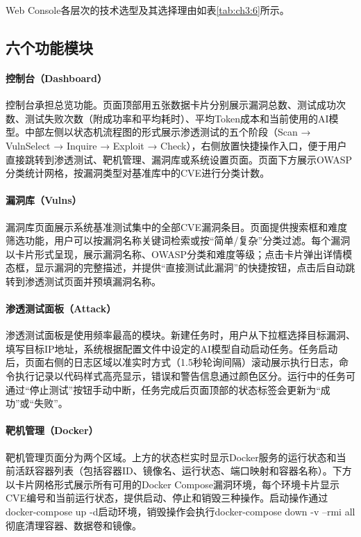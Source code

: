 Web Console各层次的技术选型及其选择理由如表\ref{tab:ch3:6}所示。

\subsection{六个功能模块}

\paragraph{控制台（Dashboard）}

控制台承担总览功能。页面顶部用五张数据卡片分别展示漏洞总数、测试成功次数、测试失败次数（附成功率和平均耗时）、平均Token成本和当前使用的AI模型。中部左侧以状态机流程图的形式展示渗透测试的五个阶段（Scan → VulnSelect → Inquire → Exploit → Check），右侧放置快捷操作入口，便于用户直接跳转到渗透测试、靶机管理、漏洞库或系统设置页面。页面下方展示OWASP分类统计网格，按漏洞类型对基准库中的CVE进行分类计数。

\paragraph{漏洞库（Vulns）}

漏洞库页面展示系统基准测试集中的全部CVE漏洞条目。页面提供搜索框和难度筛选功能，用户可以按漏洞名称关键词检索或按“简单/复杂”分类过滤。每个漏洞以卡片形式呈现，展示漏洞名称、OWASP分类和难度等级；点击卡片弹出详情模态框，显示漏洞的完整描述，并提供“直接测试此漏洞”的快捷按钮，点击后自动跳转到渗透测试页面并预填漏洞名称。

\paragraph{渗透测试面板（Attack）}

渗透测试面板是使用频率最高的模块。新建任务时，用户从下拉框选择目标漏洞、填写目标IP地址，系统根据配置文件中设定的AI模型自动启动任务。任务启动后，页面右侧的日志区域以准实时方式（1.5秒轮询间隔）滚动展示执行日志，命令执行记录以代码样式高亮显示，错误和警告信息通过颜色区分。运行中的任务可通过“停止测试”按钮手动中断，任务完成后页面顶部的状态标签会更新为“成功”或“失败”。

\paragraph{靶机管理（Docker）}

靶机管理页面分为两个区域。上方的状态栏实时显示Docker服务的运行状态和当前活跃容器列表（包括容器ID、镜像名、运行状态、端口映射和容器名称）。下方以卡片网格形式展示所有可用的Docker Compose漏洞环境，每个环境卡片显示CVE编号和当前运行状态，提供启动、停止和销毁三种操作。启动操作通过docker-compose up -d启动环境，销毁操作会执行docker-compose down -v --rmi all彻底清理容器、数据卷和镜像。

